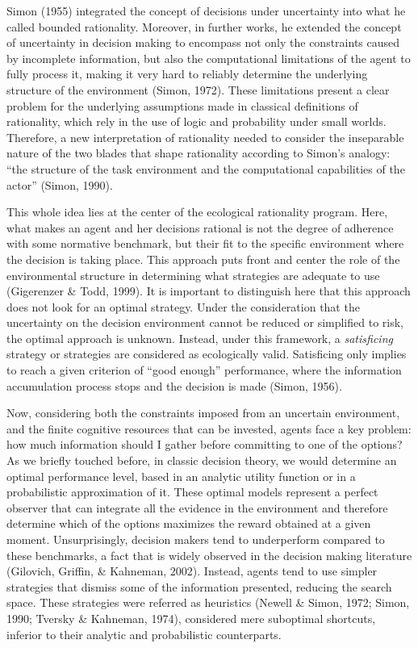 \documentclass[
  english,
  man]{apa6}
\begin{document}
Simon (1955) integrated the concept of decisions under uncertainty into what he called bounded rationality. Moreover, in further works, he extended the concept of uncertainty in decision making to encompass not only the constraints caused by incomplete information, but also the computational limitations of the agent to fully process it, making it very hard to reliably determine the underlying structure of the environment (Simon, 1972). These limitations present a clear problem for the underlying assumptions made in classical definitions of rationality, which rely in the use of logic and probability under small worlds. Therefore, a new interpretation of rationality needed to consider the inseparable nature of the two blades that shape rationality according to Simon's analogy: ``the structure of the task environment and the computational capabilities of the actor'' (Simon, 1990).

This whole idea lies at the center of the ecological rationality program. Here, what makes an agent and her decisions rational is not the degree of adherence with some normative benchmark, but their fit to the specific environment where the decision is taking place. This approach puts front and center the role of the environmental structure in determining what strategies are adequate to use (Gigerenzer \& Todd, 1999). It is important to distinguish here that this approach does not look for an optimal strategy. Under the consideration that the uncertainty on the decision environment cannot be reduced or simplified to risk, the optimal approach is unknown. Instead, under this framework, a \emph{satisficing} strategy or strategies are considered as ecologically valid. Satisficing only implies to reach a given criterion of ``good enough'' performance, where the information accumulation process stops and the decision is made (Simon, 1956).

Now, considering both the constraints imposed from an uncertain environment, and the finite cognitive resources that can be invested, agents face a key problem: how much information should I gather before committing to one of the options? As we briefly touched before, in classic decision theory, we would determine an optimal performance level, based in an analytic utility function or in a probabilistic approximation of it. These optimal models represent a perfect observer that can integrate all the evidence in the environment and therefore determine which of the options maximizes the reward obtained at a given moment. Unsurprisingly, decision makers tend to underperform compared to these benchmarks, a fact that is widely observed in the decision making literature (Gilovich, Griffin, \& Kahneman, 2002). Instead, agents tend to use simpler strategies that dismiss some of the information presented, reducing the search space. These strategies were referred as heuristics (Newell \& Simon, 1972; Simon, 1990; Tversky \& Kahneman, 1974), considered mere suboptimal shortcuts, inferior to their analytic and probabilistic counterparts.
\end{document}
